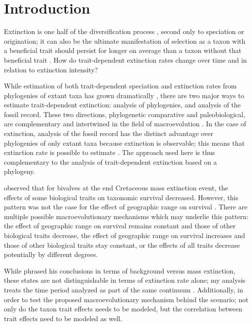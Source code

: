 \documentclass{article}
\begin{document}
\section{Introduction}

Extinction is one half of the diversification process \citep{Raup1994,Stanley1979,Stanley1975}, second only to speciation or origination; it can also be the ultimate manifestation of selection as a taxon with a beneficial trait should persist for longer on average than a taxon without that beneficial trait \citep{Rabosky2010b,Jablonski2008a,Raup1994,Stanley1975}. How do trait-dependent extinction rates change over time and in relation to extinction intensity?

While estimation of both trait-dependent speciation and extinction rates from phylogenies of extant taxa has grown dramatically \citep{Maddison2007,Fitzjohn2010,Goldberg2011a,Goldberg2005,Rabosky2013,Stadler2013b,Stadler2011a,Stadler2013a}, there are two major ways to estimate trait-dependent extinction: analysis of phylogenies, and analysis of the fossil record. These two directions, phylogenetic comparative and paleobiological, are complementary and intertwined in the field of macroevolution \citep{Rabosky2010b,Jablonski2008a,Hunt2014a}. In the case of extinction, analysis of the fossil record has the distinct advantage over phylogenies of only extant taxa because extinction is observable; this means that extinction rate is possible to estimate \citep{Rabosky2010a,Quental2009,Liow2010a}. The approach used here is thus complementary to the analysis of trait-dependent extinction based on a phylogeny.

\citet{Jablonski1986} observed that for bivalves at the end Cretaceous mass extinction event, the effects of some biological traits on taxonomic survival decreased. However, this pattern was not the case for the effect of geographic range on survival \citep{Jablonski1986,Payne2007}. There are multiple possible macroevolutionary mechanisms which may underlie this pattern: the effect of geographic range on survival remains constant and those of other biological traits decrease, the effect of geographic range on survival increases and those of other biological traits stay constant, or the effects of all traits decrease potentially by different degrees.

While \citet{Jablonski1986} phrased his conclusions in terms of background versus mass extinction, these states are not distinguishable in terms of extinction rate alone; my analysis treats the time period analyzed as part of the same continuum \citep{Wang2003,Payne2007,Simpson2009}. Additionally, in order to test the proposed macroevolutionary mechanism behind the \citet{Jablonski1986} scenario; not only do the taxon trait effects needs to be modeled, but the correlation between trait effects need to be modeled as well. 
\end{document}
